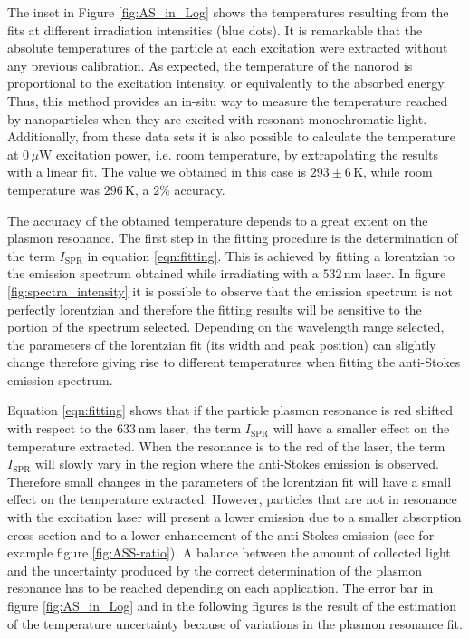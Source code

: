 \documentclass[journal=nalefd,manuscript=letter]{achemso}
\newcommand{\K}{\ensuremath{\,\textrm{K}}}
\newcommand{\nm}{\ensuremath{\,\textrm{nm}}}
\newcommand{\uW}{\ensuremath{\,\mu\textrm{W}}}
\begin{document}
The inset in Figure \ref{fig:AS_in_Log} shows the temperatures resulting from the
fits at different irradiation intensities (blue dots). It is remarkable that the
absolute temperatures of the particle at each excitation were extracted without any previous
calibration. As expected, the temperature of the nanorod is proportional to the
excitation intensity, or equivalently to the absorbed energy. Thus, this method provides
an in-situ way to measure the temperature reached by nanoparticles when they are excited
with resonant monochromatic light. 
Additionally, from these data sets it  is also possible to calculate the temperature 
at $0\uW$ excitation power, i.e.
room temperature, by extrapolating the results with a linear fit. The value we
obtained in this case is $293\pm 6 \K$, while room temperature was $296\K$, a
$2\%$ accuracy.

The accuracy of the obtained temperature depends to a great extent on the
plasmon resonance. The first step in the fitting procedure is the determination
of the term $I_\textrm{SPR}$ in equation \ref{eqn:fitting}. This is achieved by
fitting a lorentzian to the emission spectrum obtained while irradiating with a
$532\nm$ laser. In figure \ref{fig:spectra_intensity} it is possible to observe
that the emission spectrum is not perfectly lorentzian and therefore the fitting
results will be sensitive to the portion of the spectrum selected. Depending on
the wavelength range selected, the parameters of the lorentzian fit (its width
and peak position) can slightly change therefore giving rise to different
temperatures when fitting the anti-Stokes emission spectrum.

Equation \ref{eqn:fitting} shows that if the particle plasmon resonance is red
shifted with respect to the $633\nm$ laser, the term $I_\textrm{SPR}$ will have
a smaller effect on the temperature extracted. When the resonance is to the red
of the laser, the term $I_\textrm{SPR}$ will slowly vary in the region where the
anti-Stokes emission is observed. Therefore small changes in the parameters of
the lorentzian fit will have a small effect on the temperature extracted.
However, particles that are not in resonance with the excitation laser will
present a lower emission due to a smaller absorption cross section and to a
lower enhancement of the anti-Stokes emission (see for example figure
\ref{fig:ASS-ratio}). A balance between the amount of collected light and the
uncertainty produced by the correct determination of the plasmon resonance has
to be reached depending on each application. The error bar in figure
\ref{fig:AS_in_Log} and in the following figures is the result of the estimation
of the temperature uncertainty because of variations in the plasmon resonance
fit.
\end{document}
